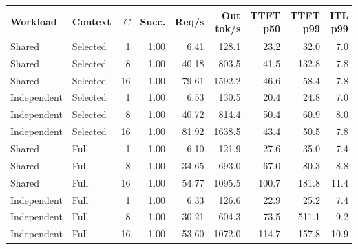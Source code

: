 \begin{tabular}{llrrrrrrr}
\toprule
Workload & Context & $C$ & Succ. & Req/s & Out tok/s & TTFT p50 & TTFT p99 & ITL p99 \\
\midrule
Shared & Selected & 1 & 1.00 & 6.41 & 128.1 & 23.2 & 32.0 & 7.0 \\
Shared & Selected & 8 & 1.00 & 40.18 & 803.5 & 41.5 & 132.8 & 7.8 \\
Shared & Selected & 16 & 1.00 & 79.61 & 1592.2 & 46.6 & 58.4 & 7.8 \\
Independent & Selected & 1 & 1.00 & 6.53 & 130.5 & 20.4 & 24.8 & 7.0 \\
Independent & Selected & 8 & 1.00 & 40.72 & 814.4 & 50.4 & 60.9 & 8.0 \\
Independent & Selected & 16 & 1.00 & 81.92 & 1638.5 & 43.4 & 50.5 & 7.8 \\
Shared & Full & 1 & 1.00 & 6.10 & 121.9 & 27.6 & 35.0 & 7.4 \\
Shared & Full & 8 & 1.00 & 34.65 & 693.0 & 67.0 & 80.3 & 8.8 \\
Shared & Full & 16 & 1.00 & 54.77 & 1095.5 & 100.7 & 181.8 & 11.4 \\
Independent & Full & 1 & 1.00 & 6.33 & 126.6 & 22.9 & 25.2 & 7.4 \\
Independent & Full & 8 & 1.00 & 30.21 & 604.3 & 73.5 & 511.1 & 9.2 \\
Independent & Full & 16 & 1.00 & 53.60 & 1072.0 & 114.7 & 157.8 & 10.9 \\
\bottomrule
\end{tabular}
